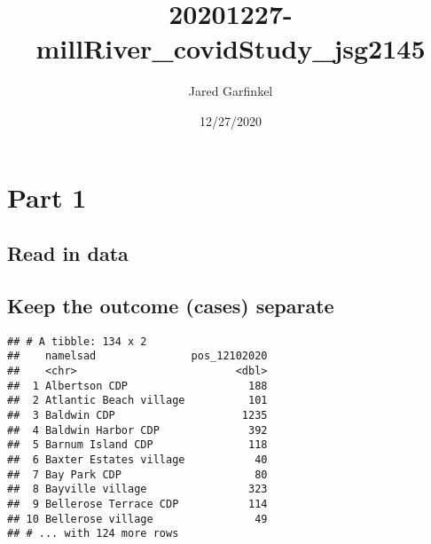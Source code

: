 \documentclass[
]{article}
\title{20201227-millRiver\_covidStudy\_jsg2145}
\author{Jared Garfinkel}
\date{12/27/2020}
\newenvironment{Shaded}{\begin{snugshade}}{\end{snugshade}}
\newcommand{\CommentTok}[1]{\textcolor[rgb]{0.56,0.35,0.01}{\textit{#1}}}
\newcommand{\DecValTok}[1]{\textcolor[rgb]{0.00,0.00,0.81}{#1}}
\newcommand{\KeywordTok}[1]{\textcolor[rgb]{0.13,0.29,0.53}{\textbf{#1}}}
\newcommand{\NormalTok}[1]{#1}
\newcommand{\OperatorTok}[1]{\textcolor[rgb]{0.81,0.36,0.00}{\textbf{#1}}}
\newcommand{\StringTok}[1]{\textcolor[rgb]{0.31,0.60,0.02}{#1}}
\begin{document}
\maketitle

\hypertarget{part-1}{%
\section{Part 1}\label{part-1}}

\hypertarget{read-in-data}{%
\subsection{Read in data}\label{read-in-data}}

\hypertarget{keep-the-outcome-cases-separate}{%
\subsection{Keep the outcome (cases)
separate}\label{keep-the-outcome-cases-separate}}

\begin{Shaded}
\end{Shaded}

\begin{verbatim}
## # A tibble: 134 x 2
##    namelsad               pos_12102020
##    <chr>                         <dbl>
##  1 Albertson CDP                   188
##  2 Atlantic Beach village          101
##  3 Baldwin CDP                    1235
##  4 Baldwin Harbor CDP              392
##  5 Barnum Island CDP               118
##  6 Baxter Estates village           40
##  7 Bay Park CDP                     80
##  8 Bayville village                323
##  9 Bellerose Terrace CDP           114
## 10 Bellerose village                49
## # ... with 124 more rows
\end{verbatim}

\begin{Shaded}
\end{Shaded}
\end{document}
